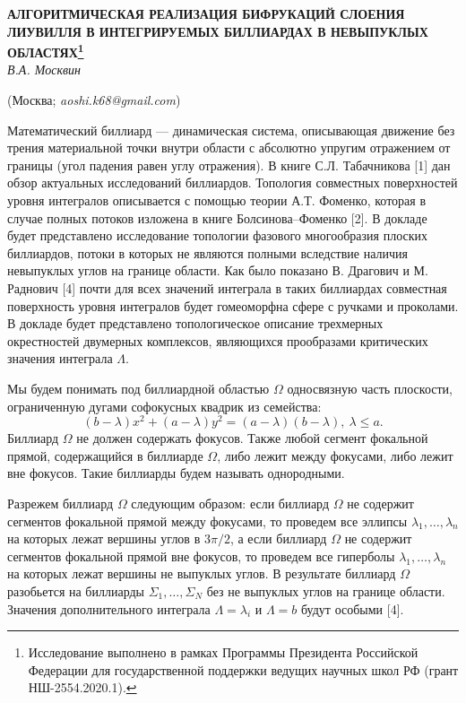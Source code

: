 
\begin{center}
    {\bf АЛГОРИТМИЧЕСКАЯ РЕАЛИЗАЦИЯ БИФРУКАЦИЙ СЛОЕНИЯ ЛИУВИЛЛЯ В ИНТЕГРИРУЕМЫХ
    	БИЛЛИАРДАХ В НЕВЫПУКЛЫХ ОБЛАСТЯХ\footnote{Исследование выполнено в рамках Программы Президента Российской Федерации для государственной поддержки ведущих научных школ РФ (грант НШ-2554.2020.1).}}\\

    {\it В.А. Москвин}

    (Москва; {\it aoshi.k68@gmail.com})
\end{center}

Математический биллиард --- динамическая система, опи\-сы\-вающая движение без трения материальной точки внутри области с абсолютно упругим отражением от границы (угол падения равен углу отражения). В книге С.Л. Табач\-никова [1] дан обзор актуальных исследований биллиардов. Тополо\-гия совместных поверхностей уровня интег\-ралов опи\-сывается с помощью теории А.Т. Фоменко, которая в случае полных потоков изло\-жена в книге Болсинова--Фоменко [2]. В докладе будет пред\-став\-лено ис\-следование топологии фазового много\-образия плос\-ких бил\-лиардов, потоки в которых не являются полными вследствие наличия не\-выпук\-лых углов на границе области. Как было показано В. Драгович и М. Раднович [4] почти для всех значений интеграла в таких биллиардах совместная поверхность уровня интегралов будет гомеоморфна сфере с ручками и проколами. В докладе будет пред\-ставлено топ\-олог\-ичес\-кое описание трехмерных ок\-рест\-ностей дву\-мерных ком\-плек\-сов, являющихся прообразами критичес\-ких значения интеграла $\Lambda$.


Мы будем понимать под биллиардной областью $\Omega$ однос\-вязную часть плоскости, ограниченную дугами софокусных квадрик из семейства:
$$(b-\lambda)x^2+(a-\lambda)y^2=(a-\lambda)(b-\lambda),~\lambda \leq a. $$
Биллиард $\Omega$ не должен содержать фокусов. Также любой сегмент фокальной прямой, содержащийся в биллиарде $\Omega$, либо лежит между фокусами, либо лежит вне фокусов. Такие биллиарды будем называть однородными.

Разрежем биллиард $\Omega$ следующим образом: если биллиард  $\Omega$ не содержит сегментов фокальной прямой между фокусами, то проведем все эллипсы $\lambda_1, \ldots, \lambda_n$ на которых лежат вершины углов в $3\pi/2$, а если биллиард $\Omega$ не содержит сегментов фокальной прямой вне фокусов, то проведем все гиперболы $\lambda_1, \ldots, \lambda_n$ на которых лежат вершины не выпуклых углов. В результате биллиард $\Omega$ разобьется на биллиарды $\Sigma_1, \ldots, \Sigma_N$ без не выпуклых углов на границе области. Значения допол\-нитель\-ного интеграла $\Lambda = \lambda_i$ и $\Lambda = b$ будут особыми [4].

